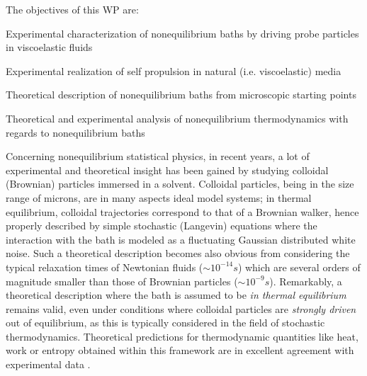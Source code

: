 \begin{workpackage}[id=WPbrown,wphases=0-48,
  short=Brown. particles, %
  title=Brownian particles in nonequilibrium baths, %
  lead=USTUTT,
  USTUTTRM=96,KULRM=6,ULEIRM=6,UNIPDRM=6]

\begin{wpobjectives}
The objectives of this WP are:
\begin{compactitem}
\item Experimental characterization of nonequilibrium baths by driving probe particles in viscoelastic fluids
\item Experimental realization of self propulsion in natural (i.e. viscoelastic) media
\item Theoretical description of nonequilibrium baths from microscopic starting points
\item Theoretical and experimental analysis of nonequilibrium thermodynamics with regards to nonequilibrium baths
  \end{compactitem}
\end{wpobjectives}

\begin{wpdescription}

Concerning nonequilibrium statistical physics, in recent years, a lot of experimental and
theoretical insight has been gained by studying colloidal (Brownian) particles immersed in a solvent.
Colloidal particles, being in the size range of microns, are in many aspects ideal
model systems; in thermal equilibrium, colloidal trajectories correspond to that of a Brownian walker, hence properly described by
simple stochastic (Langevin) equations where the interaction with the bath is modeled as a fluctuating Gaussian distributed white noise. 
Such a theoretical description becomes also obvious from considering the typical relaxation times of Newtonian fluids ($\sim 10^{-14} s$) which are several orders of magnitude 
smaller than those of Brownian particles ($\sim 10^{-9} s$). Remarkably, a theoretical description where the bath is assumed to be {\it in thermal equilibrium} remains valid, even under conditions where colloidal particles are {\it strongly driven} out of equilibrium, as this is typically considered in the field of stochastic thermodynamics. Theoretical predictions for thermodynamic quantities like heat, work or entropy obtained within this framework are in excellent agreement with experimental data \cite{blickle2006, blickle2007, blickle2012}.



\end{wpdescription}
\end{workpackage}

